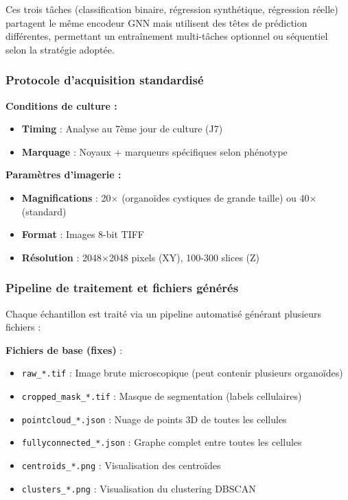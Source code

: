 Ces trois tâches (classification binaire, régression synthétique, régression réelle) partagent le même encodeur GNN mais utilisent des têtes de prédiction différentes, permettant un entraînement multi-tâches optionnel ou séquentiel selon la stratégie adoptée.

\subsubsection{Protocole d'acquisition standardisé}

\textbf{Conditions de culture :}
\begin{itemize}
    \item \textbf{Timing} : Analyse au 7ème jour de culture (J7)
    \item \textbf{Marquage} : Noyaux + marqueurs spécifiques selon phénotype
\end{itemize}

\textbf{Paramètres d'imagerie :}
\begin{itemize}
    \item \textbf{Magnifications} : 20× (organoïdes cystiques de grande taille) ou 40× (standard)
    \item \textbf{Format} : Images 8-bit TIFF
    \item \textbf{Résolution} : 2048×2048 pixels (XY), 100-300 slices (Z)
\end{itemize}

\subsubsection{Pipeline de traitement et fichiers générés}

Chaque échantillon est traité via un pipeline automatisé générant plusieurs fichiers :

\textbf{Fichiers de base (fixes)} :
\begin{itemize}
    \item \texttt{raw\_*.tif} : Image brute microscopique (peut contenir plusieurs organoïdes)
    \item \texttt{cropped\_mask\_*.tif} : Masque de segmentation (labels cellulaires)
    \item \texttt{pointcloud\_*.json} : Nuage de points 3D de toutes les cellules
    \item \texttt{fullyconnected\_*.json} : Graphe complet entre toutes les cellules
    \item \texttt{centroids\_*.png} : Visualisation des centroïdes
    \item \texttt{clusters\_*.png} : Visualisation du clustering DBSCAN
\end{itemize}

